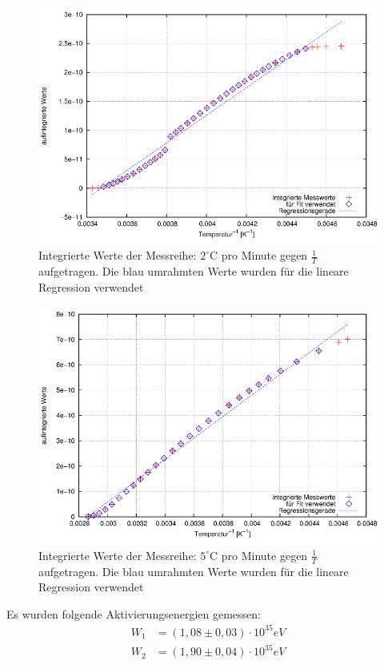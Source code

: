 \begin{figure}[H]
\includegraphics[scale=0.8]{../gnu/relax31.pdf}
\caption{Integrierte Werte der Messreihe: $2^\circ$C pro Minute gegen $\frac{1}{T}$ aufgetragen. Die blau umrahmten Werte wurden für die lineare Regression verwendet}
\label{pic_int1}
\end{figure}
\begin{figure}[H]
\includegraphics[scale=0.8]{../gnu/relax32.pdf}
\caption{Integrierte Werte der Messreihe: $5^\circ$C pro Minute gegen $\frac{1}{T}$ aufgetragen. Die blau umrahmten Werte wurden für die lineare Regression verwendet}
\label{pic_int2}
\end{figure}

Es wurden folgende Aktivierungsenergien gemessen:
\begin{align}
W_1&=(1,08    \pm 0,03)\cdot 10^{35} eV\\
W_2&=(1,90	\pm 0,04)\cdot 10^{35}eV
\end{align}

